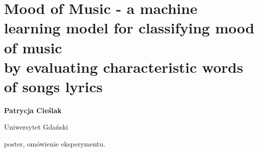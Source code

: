 \documentclass[\main/boa.tex]{subfiles}
\begin{document}
\section[Mood of Music - a machine learning model for classifying mood of music \\ by evaluating characteristic words of songs lyrics]{Mood of Music - a machine learning model for classifying mood of music \\ by evaluating characteristic words of songs lyrics}

\begin{minipage}{0.915\textwidth}
	\centering
  {\bf {}  Patrycja Cieślak}
\end{minipage}


\begin{affiliations}
\begin{minipage}{0.915\textwidth}
\centering
Uniwersytet Gdański  \\[-2pt]
\end{minipage}
\end{affiliations}

\vskip 0.3cm

 poster, omówienie eksperymentu. 
\end{document}
